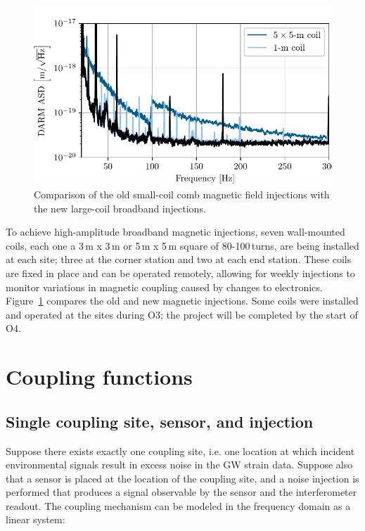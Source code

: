 \begin{figure}[h!]
	\centering
	\includegraphics{figures/wallcoil.pdf}
	\caption{
		Comparison of the old small-coil comb magnetic field injections with the new large-coil broadband injections.}
	\label{fig:wallcoil}
\end{figure}

To achieve high-amplitude broadband magnetic injections, seven wall-mounted coils, each one a 3\,m x 3\,m or 5\,m x 5\,m square of 80-100\,turns, are being installed at each site; three at the corner station and two at each end station. These coils are fixed in place and can be operated remotely, allowing for weekly injections to monitor variations in magnetic coupling caused by changes to electronics. Figure~\ref{fig:wallcoil} compares the old and new magnetic injections. Some coils were installed and operated at the sites during O3; the project will be completed by the start of O4.

\section{Coupling functions}\label{sec:cf}

\subsection{Single coupling site, sensor, and injection}

Suppose there exists exactly one coupling site, i.e. one location at which incident environmental signals result in excess noise in the \ac{GW} strain data.
Suppose also that a sensor is placed at the location of the coupling site, and a noise injection is performed that produces a signal observable by the sensor and the interferometer readout.
The coupling mechanism can be modeled in the frequency domain as a linear system:

